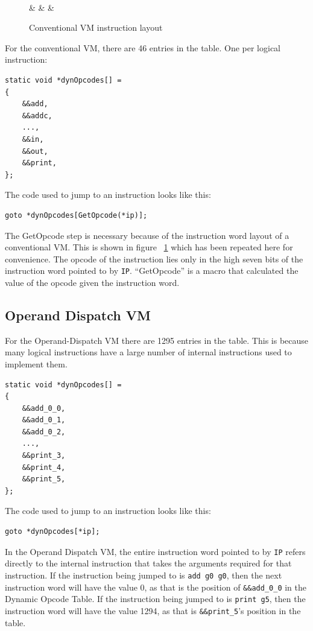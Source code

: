\documentclass[english,a4paper,12pt]{report}
\begin{document}
\begin{figure}[!htb]
	\centering
	\begin{bytefield}[bitwidth=1.5em,endianness=big]{16}
		 \\
		 &  &  & \\
	\end{bytefield}
	\caption{Conventional VM instruction layout}
	\label{fig:convinstruction2}
\end{figure}

For the conventional VM, there are 46 entries in the table. One per
logical instruction:
\begin{lstlisting}
static void *dynOpcodes[] = 
{
    &&add,
    &&addc,
    ...,
    &&in,
    &&out,
    &&print,
};
\end{lstlisting}

The code used to jump to an instruction looks like this:
\begin{lstlisting}
goto *dynOpcodes[GetOpcode(*ip)];
\end{lstlisting}
The GetOpcode step is necessary because of the instruction word layout
of a conventional VM. This is shown in figure
~\ref{fig:convinstruction2} which has been repeated here for
convenience. The opcode of the instruction lies only in the high seven
bits of the instruction word pointed to by \verb|IP|. ``GetOpcode'' is
a macro that calculated the value of the opcode given the instruction
word.


\subsection{Operand Dispatch VM}
\label{sec:operand-dispatch-dispatch}
For the Operand-Dispatch VM there are 1295 entries in the table. This
is because many logical instructions have a large number of internal
instructions used to implement them.
\begin{lstlisting}
static void *dynOpcodes[] = 
{
    &&add_0_0,
    &&add_0_1,
    &&add_0_2,
    ...,
    &&print_3,
    &&print_4,
    &&print_5,	
};	
\end{lstlisting}

The code used to jump to an instruction looks like this:
\begin{lstlisting}
goto *dynOpcodes[*ip];
\end{lstlisting}

In the Operand Dispatch VM, the entire instruction word pointed to by
\verb|IP| refers directly to the internal instruction that takes the
arguments required for that instruction. If the instruction being
jumped to is \verb|add g0 g0|, then the next instruction word will
have the value 0, as that is the position of \verb|&&add_0_0| in the
Dynamic Opcode Table. If the instruction being jumped to is
\verb|print g5|, then the instruction word will have the value 1294,
as that is \verb|&&print_5|'s position in the table.
\end{document}
